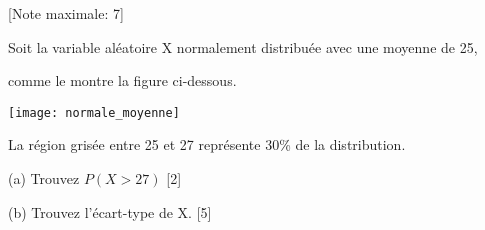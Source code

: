 \begin{question}
  \hspace*{\fill} [Note maximale: 7]\par
  \medskip
  \noindent Soit la variable aléatoire X normalement distribuée avec une moyenne de 25,\par
  \noindent comme le montre la figure ci-dessous.\par
  \medskip
  \texttt{[image: normale\_moyenne]}\par
  \medskip
  \noindent La région grisée entre 25 et 27 représente 30\% de la distribution.\par
  \medskip
  (a) Trouvez $ P(X > 27) $\hspace*{\fill} [2]\par
  \medskip
  (b) Trouvez l’écart-type de X.\hspace*{\fill} [5]\par

\end{question}

